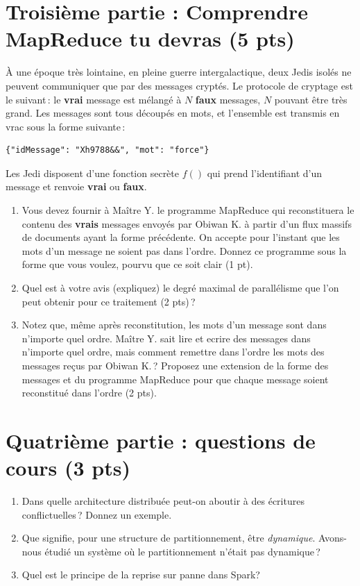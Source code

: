 \documentclass[11pt,a4paper]{article}
\begin{document}
\section*{Troisième partie : Comprendre MapReduce tu devras (5 pts)}

À une époque très lointaine, en pleine guerre intergalactique, deux Jedis 
isolés ne peuvent communiquer que par des messages cryptés. Le protocole de cryptage est le suivant\,: 
le \textbf{vrai} message est mélangé à $N$ \textbf{faux} messages, $N$ pouvant être très grand.
Les messages sont tous découpés en mots, 
et l'ensemble est 
transmis en vrac sous la forme suivante\,:

\begin{verbatim}
{"idMessage": "Xh9788&&", "mot": "force"}
\end{verbatim}

Les Jedi disposent d'une fonction secrète $f()$ qui prend l'identifiant d'un message et 
renvoie \textbf{vrai} ou \textbf{faux}.



\begin{enumerate}
 \item Vous devez fournir à Maître Y. le programme MapReduce qui reconstituera le contenu 
 des \textbf{vrais} messages envoyés par 
    Obiwan K. à partir d'un flux massifs de documents ayant la forme précédente. On accepte
    pour l'instant que les mots d'un message ne soient pas dans l'ordre.
   Donnez ce programme sous la forme que vous voulez, pourvu que ce soit clair (1 pt).
   \item Quel est à votre avis (expliquez) le degré maximal
        de parallélisme que l'on peut obtenir pour ce traitement (2 pts)\,?
   \item Notez que, même après reconstitution, les mots d'un message sont dans n'importe quel ordre. 
    Maître Y. sait lire et ecrire des messages dans n'importe quel ordre, 
    mais comment remettre dans l'ordre les mots des 
    messages reçus par Obiwan K.\,? Proposez une extension de la forme des messages et
    du programme MapReduce pour que chaque message soient reconstitué dans l'ordre (2 pts).
 \end{enumerate}


\section*{Quatrième partie : questions de cours (3 pts)}


\begin{enumerate}
  \item Dans quelle architecture distribuée peut-on aboutir à des écritures conflictuelles\,? Donnez un exemple.
     
  \item Que signifie, pour  une structure de partitionnement, être \emph{dynamique}. Avons-nous
     étudié un système où le partitionnement n'était pas dynamique\,?
   
   \item Quel est le principe de la reprise sur panne dans Spark?\,
\end{enumerate}
\end{document}
